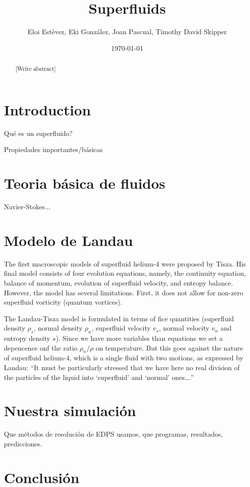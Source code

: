 \documentclass{article}
\title{Superfluids}
\author{Eloi Estèvez, Eki González, Joan Pascual, Timothy David Skipper}
\date{\today}
\begin{document}
\maketitle
\begin{abstract}
    [Write abstract]
\end{abstract}

\section{Introduction}

Qué es un superfluido?

Propiedades importantes/básicas

\section{Teoria básica de fluidos}

Navier-Stokes...

\section{Modelo de Landau}

The first macroscopic models of superfluid helium-4 were
proposed by Tisza. His final model consists of four evolution equations,
namely, the continuity equation, balance of momentum, evolution of superfluid
velocity, and entropy balance. However, the model has several limitations.
First, it does not allow for non-zero superfluid vorticity (quantum vortices).

The Landau-Tisza model is formulated in terms of fice quantities (superfluid
density $\rho_s$, normal density $\rho_n$, superfluid velocity $v_s$, normal
velocity $v_n$ and entropy density $s$). Since we have more variables than
equations we set a depencence onf the ratio $\rho_n/\rho$ on temperature. But
this goes against the nature of superfluid helium-4, which is a single fluid
with two motions, as expressed by Landau: “It must be particularly stressed
that we
have here no real division of the particles of the liquid into `superfluid'
and `normal' ones….”

\section{Nuestra simulación}
Que métodos de resolución de EDPS usamos, que programas, resultados,
predicciones.

\section{Conclusión}
\end{document}
